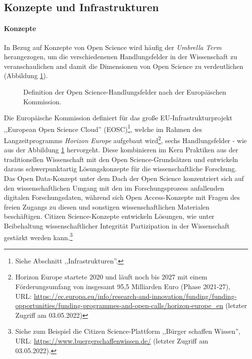 \subsection{Konzepte und Infrastrukturen} 

\paragraph{Konzepte}

In Bezug auf Konzepte von Open Science wird häufig der \textit{Umbrella Term} herangezogen, um die verschiedenenen Handlungsfelder in der Wissenschaft zu veranschaulichen and damit die Dimensionen von Open Science zu verdeutlichen (Abbildung \ref{fig:openscience1}). 

\begin{figure}[h]
    \centering
    \caption{Definition der Open Science-Handlungsfelder nach der Europäischen Kommission.\protect\footnotemark}
    \label{fig:openscience1}
\end{figure} 

Die Europäische Kommission definiert für das große EU-Infrastrukturprojekt ,,European Open Science Cloud'' (EOSC)\footnote{Siehe Abschnitt ,,Infrastrukturen''.}, welche im Rahmen des Langzeitprogramms \textit{Horizon Europe} aufgebaut wird\footnote{Horizon Europe startete 2020 und läuft noch bis 2027 mit einem Förderungsumfang von insgesamt 95,5 Milliarden Euro (Phase 2021-27), URL: \url{https://ec.europa.eu/info/research-and-innovation/funding/funding-opportunities/funding-programmes-and-open-calls/horizon-europe_en} (letzter Zugriff am 03.05.2022)}, sechs Handlungsfelder - wie aus der Abbildung \ref{fig:openscience1} hervorgeht. Diese kombinieren im Kern Praktiken aus der traditionellen Wissenschaft mit den Open Science-Grundsätzen und entwickeln daraus schwerpunktartig Lösungskonzepte für die wissenschaftliche Forschung. Das Open Data-Konzept unter dem Dach der Open Science konzentriert sich auf den wissenschaftlichen Umgang mit den im Forschungsprozess anfallenden digitalen Forschungsdaten, während sich Open Access-Konzepte mit Fragen des freien Zugangs zu diesen und sonstigen wissenschaftlichen Materialen beschäftigen. Citizen Science-Konzepte entwickeln Lösungen, wie unter Beibehaltung wissenschaftlicher Integrität Partizipation in der Wissenschaft gestärkt werden kann.\footnote{Siehe zum Beispiel die Citizen Science-Plattform ,,Bürger schaffen Wissen'', URL: \url{https://www.buergerschaffenwissen.de/} (letzter Zugriff am 03.05.2022).}

